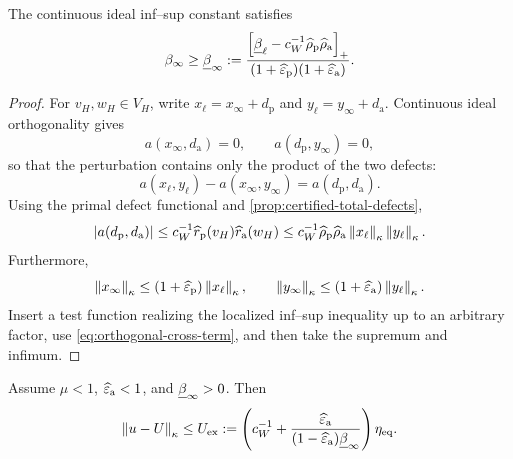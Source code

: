 \begin{proposition}
\label{prop:continuous-ideal-stability}
The continuous ideal inf--sup constant satisfies
\begin{equation}
\label{eq:beta-infinity-certified}
  \beta_\infty\geq\underline\beta_\infty
  :=\frac{
      \left[\underline\beta_\ell
      -c_W^{-1}\widehat\rho_{\mathrm p}\widehat\rho_{\mathrm a}\right]_+
    }{(1+\widehat\varepsilon_{\mathrm p})(1+\widehat\varepsilon_{\mathrm a})}.
\end{equation}
\end{proposition}

\begin{proof}
For $v_H,w_H\in V_H$, write
$x_\ell=x_\infty+d_{\mathrm p}$ and
$y_\ell=y_\infty+d_{\mathrm a}$.  Continuous ideal orthogonality gives
\[
  a(x_\infty,d_{\mathrm a})=0,
  \qquad
  a(d_{\mathrm p},y_\infty)=0,
\]
so that the perturbation contains only the product of the two defects:
\begin{equation}
\label{eq:orthogonal-cross-term}
  a(x_\ell,y_\ell)-a(x_\infty,y_\infty)
  =a(d_{\mathrm p},d_{\mathrm a}).
\end{equation}
Using the primal defect functional and
\cref{prop:certified-total-defects},
\[
  |a(d_{\mathrm p},d_{\mathrm a})|
  \leq c_W^{-1}\widehat r_{\mathrm p}(v_H)
                     \widehat r_{\mathrm a}(w_H)
  \leq c_W^{-1}\widehat\rho_{\mathrm p}\widehat\rho_{\mathrm a}
       \left\lVert x_\ell\right\rVert_\kappa\left\lVert y_\ell\right\rVert_\kappa.
\]
Furthermore,
\[
  \left\lVert x_\infty\right\rVert_\kappa
  \leq(1+\widehat\varepsilon_{\mathrm p})\left\lVert x_\ell\right\rVert_\kappa,
  \qquad
  \left\lVert y_\infty\right\rVert_\kappa
  \leq(1+\widehat\varepsilon_{\mathrm a})\left\lVert y_\ell\right\rVert_\kappa.
\]
Insert a test function realizing the localized inf--sup inequality up to
an arbitrary factor, use \eqref{eq:orthogonal-cross-term}, and then take
the supremum and infimum.
\end{proof}

\begin{theorem}
\label{thm:exact-solution-upper}
Assume $\mu<1$, $\widehat\varepsilon_{\mathrm a}<1$, and $\underline\beta_\infty>0$.  Then
\begin{equation}
\label{eq:exact-solution-upper}
  \left\lVert u-U\right\rVert_\kappa
  \leq U_{\mathrm{ex}}
  :=\left(
      c_W^{-1}
      +\frac{\widehat\varepsilon_{\mathrm a}}{(1-\widehat\varepsilon_{\mathrm a})\underline\beta_\infty}
    \right)\eta_{\mathrm{eq}}.
\end{equation}
\end{theorem}

